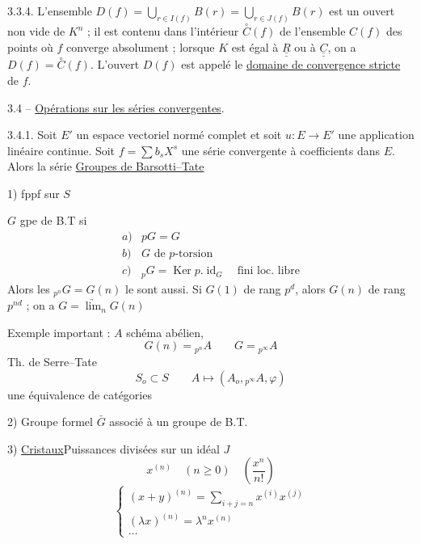 3.3.4. L'ensemble $D(f)=\bigcup_{r\in I(f)}B(r)=\bigcup_{r\in J(f)}B(r)$ est un ouvert non vide de $K^n$ ; il est contenu dans l'intérieur $\overset{\circ}{C}(f)$ de l'ensemble $C(f)$ des points où $f$ converge absolument ; lorsque $K$ est égal à $\underline{\underline{R}}$ ou à $\underline{\underline{C}}$, on a $D(f)=\overset{\circ}{C}(f)$. L'ouvert $D(f)$ est appelé le \uline{domaine de convergence stricte} de $f$.

3.4 -- \uline{Opérations sur les séries convergentes}.

3.4.1. Soit $E'$ un espace vectoriel normé complet et soit $u:E\longrightarrow E'$ une application linéaire continue. Soit $f=\sum b_sX^s$ une série convergente à coefficients dans $E$. Alors la série
\uline{Groupes de Barsotti--Tate}

1) fppf sur $S$

$G$ gpe de B.T si
\[
\begin{array}{ll}
a)&pG=G\\
b)&G\text{ de $p$-torsion}\\
c)&{}_pG=\operatorname{Ker}p.\operatorname{id}_G\quad\text{fini loc. libre}
\end{array}
\]
Alors les ${}_{p^n}G=G(n)$ le sont aussi. Si $G(1)$ de rang $p^d$, alors $G(n)$ de rang $p^{nd}$ ; on a $G=\underrightarrow{\lim}_nG(n)$

Exemple important : $A$ schéma abélien,
\[
G(n)={}_{p^n}A\qquad G={}_{p^\infty}A
\]
 Th. de Serre--Tate
\[
S_o\subset S\qquad A\longmapsto(A_o,{}_{p^\infty}A,\varphi)
\]
une équivalence de catégories

2) Groupe formel $\bar G$ associé à un groupe de B.T.

3) \uline{Cristaux}\qquad Puissances divisées sur un idéal $J$
\[
x^{(n)}\quad(n\geq0)\quad\left(\frac{x^n}{n!}\right)
\]
\[
\left\{\begin{array}{l}
(x+y)^{(n)}=\displaystyle\sum_{i+j=n}x^{(i)}x^{(j)}\\[1em]
(\lambda x)^{(n)}=\lambda^n x^{(n)}\\[2em]
\ldots
\end{array}\right.
\]


